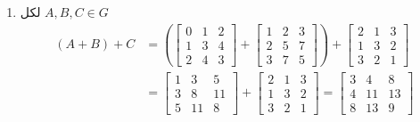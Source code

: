 \begin{example}
\begin{enumerate}[label=\textbf{\xslalph*)}, leftmargin=*]
		\item لكل $A, B, C\in G$
		\begin{align*}
			(A + B) + C &= 
			\left(
			\begin{bmatrix}
				0&1&2\\
				1&3&4\\
				2&4&3
			\end{bmatrix} + 
			\begin{bmatrix}
				1&2&3\\
				2&5&7\\
				3&7&5
			\end{bmatrix}
			\right) + 
			\begin{bmatrix}
				2&1&3\\
				1&3&2\\
				3&2&1
			\end{bmatrix}\\
			&= 
			\begin{bmatrix}
				1&3&5\\
				3&8&11\\
				5&11&8
			\end{bmatrix} + 
			\begin{bmatrix}
				2&1&3\\
				1&3&2\\
				3&2&1
			\end{bmatrix}=
			\begin{bmatrix}
				3&4&8\\
				4&11&13\\
				8&13&9
			\end{bmatrix}
		\end{align*}
		

\end{enumerate}
\end{example}
